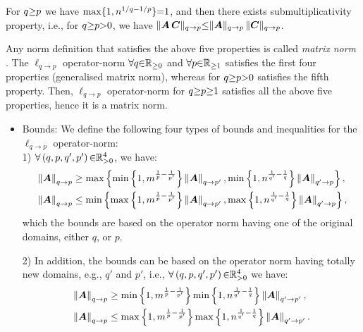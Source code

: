 \begin{property}
\begin{itemize}
For $q {\geq} p$ we have $\max \{1 , n^{1/q {-} 1/p} \} {=} 1$, and then there exists submultiplicativity property, i.e., for $q {\geq} p {>} 0$, we have $\Vert \boldsymbol{A} \, \boldsymbol{C} \Vert_{q {\to} p} {\leq} \Vert \boldsymbol{A} \Vert_{q {\to} p} \, \Vert \boldsymbol{C} \Vert_{q {\to} p}$.
\end{itemize}
\begin{remark}
\label{rmrk:Oprtr-nrm-matrx}
Any norm definition that satisfies the above five properties is called \emph{matrix norm} \cite{HornR.A.2012}.
The $\ell_{q \to p}$ operator-norm $\forall q {\in} \mathbb{R}_{{\geq} 0}$ and $\forall p {\in} \mathbb{R}_{{\geq} 1}$ satisfies the first four properties (generalised matrix norm), whereas for $q {\geq} p {>} 0$ satisfies the fifth property.
Then, $\ell_{q \to p}$ operator-norm for $q {\geq} p {\geq} 1$ satisfies all the above five properties, hence it is a matrix norm.
\end{remark}
\begin{itemize}
\item Bounds: We define the following four types of bounds and inequalities for the $\ell_{q {\to} p}$ operator-norm: \\
1) $\forall \left( q , p , q' , p' \right) {\in} \mathbb{R}^4_{>0}$, we have:
\begin{gather*}
\begin{aligned}
&\left\lVert\boldsymbol{A}\right\rVert_{q \to p} \geq \max \left\lbrace \min \left\lbrace 1 , m^{\frac1p - \frac{1}{p'}} \right\rbrace \left\lVert\boldsymbol{A}\right\rVert_{q \to p'} , \min \left\lbrace 1 , n^{\frac{1}{q'} - \frac1q} \right\rbrace \left\lVert\boldsymbol{A}\right\rVert_{q' \to p} \right\rbrace, \\
&\left\lVert\boldsymbol{A}\right\rVert_{q \to p} \leq \min \left\lbrace \max \left\lbrace 1 , m^{\frac1p - \frac{1}{p'}} \right\rbrace \left\lVert\boldsymbol{A}\right\rVert_{q \to p'} , \max \left\lbrace 1 , n^{\frac{1}{q'} - \frac1q} \right\rbrace \left\lVert\boldsymbol{A}\right\rVert_{q' \to p} \right\rbrace,
\end{aligned}
\end{gather*}
which the bounds are based on the operator norm having one of the original domains, either $q$, or $p$.

2) In addition, the bounds can be based on the operator norm having totally new domains, e.g., $q'$ and $p'$, i.e., $\forall \left( q , p , q' , p' \right) {\in} \mathbb{R}^4_{>0}$ we have:
\begin{gather*}
\begin{aligned}
&\left\lVert\boldsymbol{A}\right\rVert_{q \to p} \geq \min \left\lbrace 1 , m^{\frac1p - \frac{1}{p'}} \right\rbrace \min \left\lbrace 1 , n^{\frac{1}{q'} - \frac1q} \right\rbrace \left\lVert\boldsymbol{A}\right\rVert_{q' \to p'}, \\
&\left\lVert\boldsymbol{A}\right\rVert_{q \to p} \leq \max \left\lbrace 1 , m^{\frac1p - \frac{1}{p'}} \right\rbrace \max \left\lbrace 1 , n^{\frac{1}{q'} - \frac1q} \right\rbrace \left\lVert\boldsymbol{A}\right\rVert_{q' \to p'}.
\end{aligned}
\end{gather*}




\end{itemize}
\end{property}
